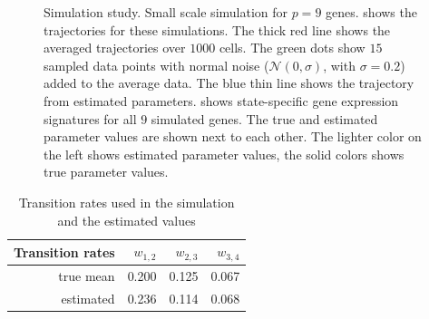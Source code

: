 \begin{figure}
  \centering
  \caption{Simulation study. Small scale simulation for $p=9$ genes.  shows the trajectories for these simulations. The thick red line shows the averaged trajectories over $1000$ cells. The green dots show $15$ sampled data points with normal noise ($\mathcal{N}(0, \sigma)$, with $\sigma=0.2$) added to the average data. The blue thin line shows the trajectory from estimated parameters.  shows state-specific gene expression signatures for all $9$ simulated genes. The true and estimated parameter values are shown next to each other. The lighter color on the left shows estimated parameter values, the solid colors shows true parameter values.} 
  \label{fig:small-scale-sim}
\end{figure}

\begin{table}[h]
    \centering
\begin{tabular}{r|rrr}
  \hline \hline
  \bf{Transition rates}& $w_{1,2}$ & $w_{2,3}$ & $w_{3,4}$ \\ 
  \hline
  true mean & 0.200 & 0.125 & 0.067 \\ 
  estimated & 0.236 & 0.114 & 0.068 \\ 
   \hline
 \end{tabular}
 \caption{Transition rates used in the simulation and the estimated values}
 \label{tab:fit-w}
\end{table}

